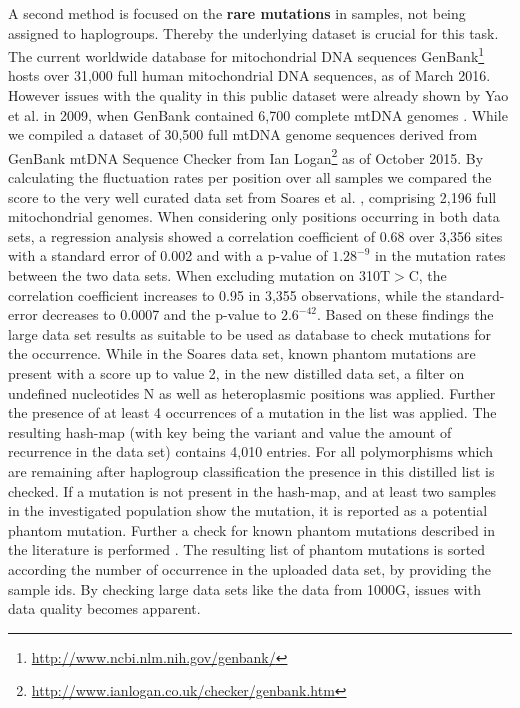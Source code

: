 A second method is focused on the \textbf{rare mutations} in samples, not being assigned to haplogroups. Thereby the underlying dataset is crucial for this task. The current worldwide database for mitochondrial DNA sequences GenBank\footnote{\url{http://www.ncbi.nlm.nih.gov/genbank/}} hosts over 31,000 full human mitochondrial DNA sequences, as of March 2016. However issues with the quality in this public dataset were already shown by Yao et al. in 2009, when GenBank contained 6,700 complete mtDNA genomes \cite{Yao2009}. While we compiled a dataset of 30,500 full mtDNA genome sequences derived from GenBank mtDNA Sequence Checker from Ian Logan\footnote{\url{http://www.ianlogan.co.uk/checker/genbank.htm}} as of October 2015. By calculating the fluctuation rates per position over all samples we compared the score to the very well curated data set from Soares et al. \cite{Soares2009}, comprising 2,196 full mitochondrial genomes. When considering only positions occurring in both data sets, a regression analysis showed a correlation coefficient of 0.68 over 3,356 sites with a standard error of 0.002 and with a p-value of $1.28^{-9}$ in the mutation rates between the two data sets. When excluding mutation on 310T$>$C, the correlation coefficient increases to 0.95 in 3,355 observations, while the standard-error decreases to 0.0007 and the p-value to $2.6^{-42}$. Based on these findings the large data set results as suitable to be used as database to check mutations for the occurrence. While in the Soares data set, known phantom mutations are present with a score up to value 2, in the new distilled data set, a filter on undefined nucleotides N as well as heteroplasmic positions was applied. Further the presence of  at least 4 occurrences of a mutation in the list was applied. The resulting hash-map (with key being the variant and value the amount of recurrence in the data set) contains 4,010 entries. 
For all polymorphisms which are remaining after haplogroup classification the presence in this distilled list is checked. If a mutation is not present in the hash-map, and at least two samples in the investigated population show the mutation, it is reported as a potential phantom mutation. Further a check for known phantom mutations described in the literature is performed \cite{Brandstatter2005,Bandelt2002}. The resulting list of phantom mutations is sorted according the number of occurrence in the uploaded data set, by providing the sample ids. By checking large data sets like the data from 1000G, issues with data quality becomes apparent.

